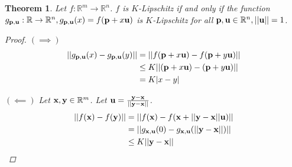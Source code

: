 \documentclass{article}
\newcommand\bb\mathbb
\newcommand\ve\varepsilon
\renewcommand\vec\textbf
\newtheorem{theorem}{Theorem}
\newtheorem{lemma}{Lemma}
\begin{document}
\begin{theorem}
\label{dim-reduction}
Let $f:\bb R^m\to\bb R^n$. $f$ is $K$-Lipschitz if and only if
the function $g_{\vec p,\vec u}:\bb R\to\bb R^n,
g_{\vec p,\vec u}(x) = f(\vec p + x \vec u)$ is $K$-Lipschitz for all $\vec p,\vec u\in\bb R^n,||\vec u||=1$.
\begin{proof}
$(\implies)$
\begin{align*}
||g_{\vec p,\vec u}(x) - g_{\vec p,\vec u}(y)|| &= ||f(\vec p + x\vec u) - f(\vec p + y\vec u)||\\
&\leq K||(\vec p + x\vec u) - (\vec p + y\vec u)||\\
&= K|x-y|
\end{align*}

$(\impliedby)$
Let $\vec x,\vec y\in\bb R^m$. Let $\vec u = \frac{\vec y-\vec x}{||\vec y-\vec x||}$.
\begin{align*}
||f(\vec x)-f(\vec y)|| &= ||f(\vec x) - f(\vec x + ||\vec y-\vec x||\vec u)||\\
&= ||g_{\vec x,\vec u}(0) - g_{\vec x,\vec u}(||\vec y-\vec x||)||\\
&\leq K||\vec y-\vec x||
\end{align*}
\end{proof}
\end{theorem}

\end{document}
